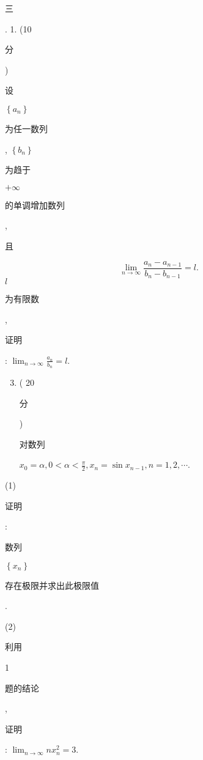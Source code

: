 \documentclass[10pt]{article}
\begin{document}
\begin{CJK}{UTF8}{mj}三\end{CJK}. 1. (10 \begin{CJK}{UTF8}{mj}分\end{CJK}) \begin{CJK}{UTF8}{mj}设\end{CJK} $\left\{a_{n}\right\}$ \begin{CJK}{UTF8}{mj}为任一数列\end{CJK}, $\left\{b_{n}\right\}$ \begin{CJK}{UTF8}{mj}为趋于\end{CJK} $+\infty$ \begin{CJK}{UTF8}{mj}的单调增加数列\end{CJK}, \begin{CJK}{UTF8}{mj}且\end{CJK}
$$
\lim _{n \rightarrow \infty} \frac{a_{n}-a_{n-1}}{b_{n}-b_{n-1}}=l .
$$
$l$ \begin{CJK}{UTF8}{mj}为有限数\end{CJK}, \begin{CJK}{UTF8}{mj}证明\end{CJK}: $\lim _{n \rightarrow \infty} \frac{a_{n}}{b_{n}}=l$.

\begin{enumerate}
  \setcounter{enumi}{2}
  \item ( 20 \begin{CJK}{UTF8}{mj}分\end{CJK}) \begin{CJK}{UTF8}{mj}对数列\end{CJK} $x_{0}=\alpha, 0<\alpha<\frac{\pi}{2}, x_{n}=\sin x_{n-1}, n=1,2, \cdots$.
\end{enumerate}
(1) \begin{CJK}{UTF8}{mj}证明\end{CJK}: \begin{CJK}{UTF8}{mj}数列\end{CJK} $\left\{x_{n}\right\}$ \begin{CJK}{UTF8}{mj}存在极限并求出此极限值\end{CJK}.

(2) \begin{CJK}{UTF8}{mj}利用\end{CJK} 1 \begin{CJK}{UTF8}{mj}题的结论\end{CJK}, \begin{CJK}{UTF8}{mj}证明\end{CJK}: $\lim _{n \rightarrow \infty} n x_{n}^{2}=3$.
\end{document}
